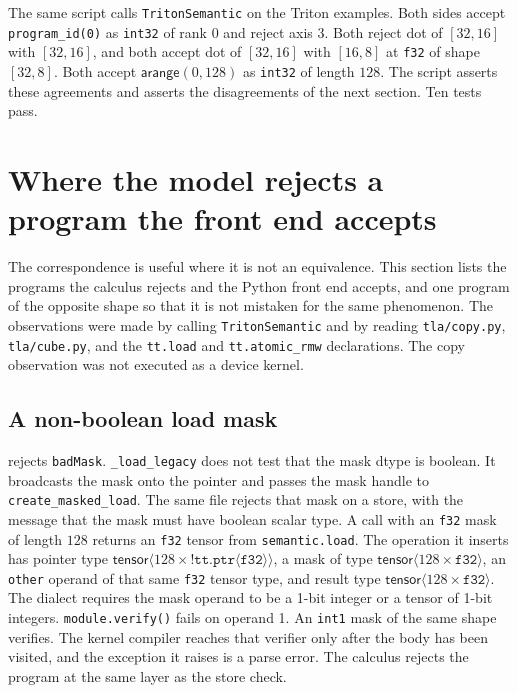 \documentclass[a4paper,UKenglish,anonymous,cleveref,autoref]{lipics-v2021}
\begin{document}
The same script calls \texttt{TritonSemantic} on the Triton examples.
Both sides accept \texttt{program\_id(0)} as \texttt{int32} of rank \(0\) and reject axis \(3\).
Both reject dot of \([32,16]\) with \([32,16]\), and both accept dot of \([32,16]\) with \([16,8]\) at \texttt{f32} of shape \([32,8]\).
Both accept \(\mathsf{arange}(0,128)\) as \texttt{int32} of length \(128\).
The script asserts these agreements and asserts the disagreements of the next section.
Ten tests pass.

\section{Where the model rejects a program the front end accepts}
\label{sec:gaps}

The correspondence is useful where it is not an equivalence.
This section lists the programs the calculus rejects and the Python front end accepts, and one program of the opposite shape so that it is not mistaken for the same phenomenon.
The observations were made by calling \texttt{TritonSemantic} and by reading \texttt{tla/copy.py}, \texttt{tla/cube.py}, and the \texttt{tt.load} and \texttt{tt.atomic\_rmw} declarations.
The copy observation was not executed as a device kernel.

\subsection{A non-boolean load mask}

 rejects \texttt{badMask}.
\texttt{\_load\_legacy} does not test that the mask dtype is boolean.
It broadcasts the mask onto the pointer and passes the mask handle to \texttt{create\_masked\_load}.
The same file rejects that mask on a store, with the message that the mask must have boolean scalar type.
A call with an \texttt{f32} mask of length \(128\) returns an \texttt{f32} tensor from \texttt{semantic.load}.
The operation it inserts has pointer type \(\mathsf{tensor}\langle 128 \times {!}\texttt{tt.ptr}\langle\texttt{f32}\rangle\rangle\), a mask of type \(\mathsf{tensor}\langle 128 \times \texttt{f32}\rangle\), an \texttt{other} operand of that same \texttt{f32} tensor type, and result type \(\mathsf{tensor}\langle 128 \times \texttt{f32}\rangle\).
The dialect requires the mask operand to be a 1-bit integer or a tensor of 1-bit integers.
\texttt{module.verify()} fails on operand 1.
An \texttt{int1} mask of the same shape verifies.
The kernel compiler reaches that verifier only after the body has been visited, and the exception it raises is a parse error.
The calculus rejects the program at the same layer as the store check.
\end{document}

